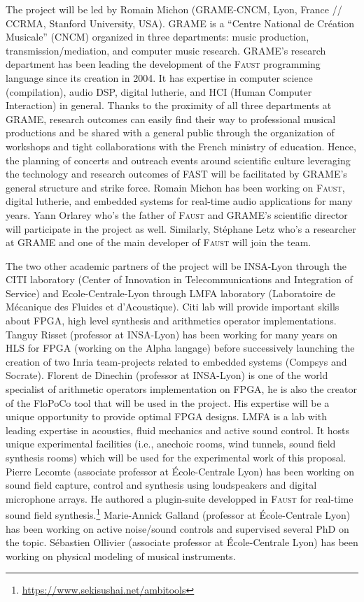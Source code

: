 \documentclass[a4paper,10pt]{article}
\newcommand{\F}{\textsc{Faust}}
\newcommand{\PP}{FAST}
\begin{document}
The project will be led by Romain Michon (GRAME-CNCM, Lyon, France // CCRMA, Stanford University, USA). GRAME is a ``Centre National de Création Musicale'' (CNCM) organized in three departments: music production, transmission/mediation, and computer music research. GRAME's research department has been leading the development of the \F{} programming language since its creation in 2004. It has expertise in computer science (compilation), audio DSP, digital lutherie, and HCI (Human Computer Interaction) in general. Thanks to the proximity of all three departments at GRAME, research outcomes can easily find their way to professional musical productions and be shared with a general public through the organization of workshops and tight collaborations with the French ministry of education. Hence, the planning of concerts and outreach events around scientific culture leveraging the technology and research outcomes of \PP{} will be facilitated by GRAME's general structure and strike force. Romain Michon has been working on \F{}, digital lutherie, and embedded systems for real-time audio applications for many years. Yann Orlarey who's the father of \F{} and GRAME's scientific director will participate in the project as well. Similarly, Stéphane Letz who's a researcher at GRAME and one of the main developer of \F{} will join the team. 

The two other academic partners of the project will be INSA-Lyon through  the CITI laboratory (Center of Innovation in Telecommunications and Integration of Service) and Ecole-Centrale-Lyon through LMFA laboratory (Laboratoire de Mécanique des Fluides et d'Acoustique). Citi lab will provide important skills about FPGA, high level synthesis and arithmetics operator implementations. Tanguy Risset (professor at INSA-Lyon) has been working for many years on HLS for FPGA (working on the Alpha langage) before successively launching the creation of two Inria team-projects related to embedded systems (Compsys and Socrate). Florent de Dinechin (professor at INSA-Lyon) is one of the world specialist of arithmetic operators implementation on FPGA, he is also the creator of the FloPoCo tool that will be used in the project.  His expertise will be a unique opportunity to provide optimal FPGA designs. LMFA is a lab with leading expertise in acoustics, fluid mechanics and active sound control. It hosts unique experimental facilities (i.e., anechoic rooms, wind tunnels, sound field synthesis rooms) which will be used for the experimental work of this proposal. Pierre Lecomte (associate professor at École-Centrale Lyon) has been working on sound field capture, control and synthesis using loudspeakers and digital microphone arrays. He authored a plugin-suite developped in \F{} for real-time sound field synthesis.\footnote{\url{https://www.sekisushai.net/ambitools}} Marie-Annick Galland (professor at École-Centrale Lyon) has been working on active noise/sound controls and supervised several PhD on the topic. Sébastien Ollivier (associate professor at École-Centrale Lyon) has been working on physical modeling of musical instruments.
\end{document}
